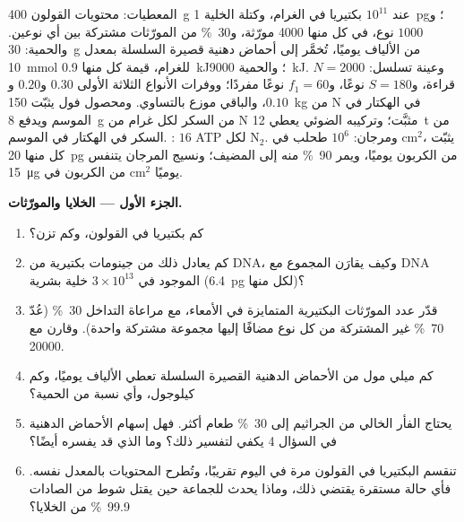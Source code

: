 \begin{problem}
\label{pb:b3:microbiomes:1}
المعطيات: محتويات القولون \qty{400}{g} عند $10^{11}$ بكتيريا
في الغرام، وكتلة الخلية \qty{1}{pg}؛ و$1000$ نوع، في كل
منها \num{4000} مورّثة، و\qty{30}{\%} من المورّثات مشتركة
بين أي نوعين. والحمية: \qty{30}{g} من الألياف يوميًا،
تُخمَّر إلى أحماض دهنية قصيرة السلسلة بمعدل \qty{10}{mmol}
للغرام، قيمة كل منها \qty{0.9}{kJ}؛ والحمية \qty{9000}{kJ}.
وعينة تسلسل: $N = 2000$ قراءة، و$S = 180$ نوعًا، و$f_{1} = 60$
نوعًا مفردًا؛ ووفرات الأنواع الثلاثة الأولى $0.30$ و$0.20$
و$0.10$، والباقي موزع بالتساوي. ومحصول فول يثبّت
\qty{150}{kg} من N في الهكتار في الموسم ويدفع \qty{8}{g} من
السكر لكل غرام من N مثبَّت؛ وتركيبه الضوئي يعطي \qty{12}{t}
من السكر في الهكتار في الموسم. : $16$ ATP لكل
N$_{2}$. ومرجان: $10^{6}$ طحلب في cm$^{2}$، يثبّت كل منها
\qty{20}{pg} من الكربون يوميًا، ويمر \qty{90}{\%} منه إلى
المضيف؛ ونسيج المرجان يتنفس \qty{15}{\micro g} من الكربون
في cm$^{2}$ يوميًا.

\medskip
\noindent\textbf{الجزء الأول --- الخلايا والمورّثات.}
\begin{enumerate}
  \item كم بكتيريا في القولون، وكم تزن؟
  \item كم يعادل ذلك من جينومات بكتيرية من DNA، وكيف يقارَن
        المجموع مع DNA الموجود في $3\times 10^{13}$ خلية
        بشرية (\qty{6.4}{pg} لكل منها)؟
  \item قدّر عدد المورّثات البكتيرية المتمايزة في الأمعاء،
        مع مراعاة التداخل \qty{30}{\%} (عُدّ \qty{70}{\%} غير
        المشتركة من كل نوع مضافًا إليها مجموعة مشتركة
        واحدة). وقارن مع \num{20000}.
  \item كم ميلي مول من الأحماض الدهنية القصيرة السلسلة
        تعطي الألياف يوميًا، وكم كيلوجول، وأي نسبة من
        الحمية؟
  \item يحتاج الفأر الخالي من الجراثيم إلى \qty{30}{\%} طعام
        أكثر. فهل إسهام الأحماض الدهنية في السؤال 4 يكفي
        لتفسير ذلك؟ وما الذي قد يفسره أيضًا؟
  \item تنقسم البكتيريا في القولون مرة في اليوم تقريبًا،
        وتُطرح المحتويات بالمعدل نفسه. فأي حالة مستقرة
        يقتضي ذلك، وماذا يحدث للجماعة حين يقتل شوط من
        الصادات \qty{99.9}{\%} من الخلايا؟
\end{enumerate}


\end{problem}
